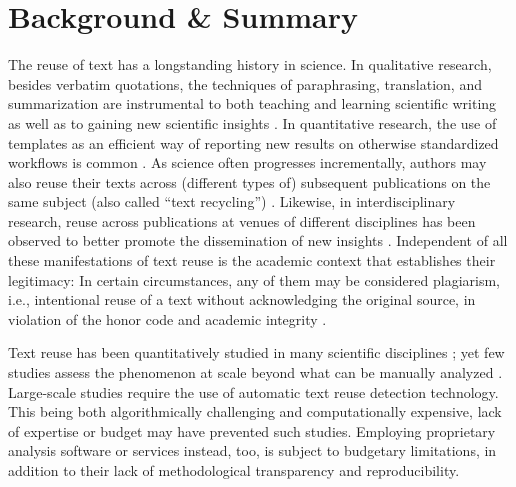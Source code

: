\section*{Background \& Summary}



The reuse of text has a longstanding history in science. In qualitative research, besides verbatim quotations, the techniques of paraphrasing, translation, and summarization are instrumental to both teaching and learning scientific writing as well as to gaining new scientific insights \cite{sun:2015}. In quantitative research, the use of templates as an efficient way of reporting new results on otherwise standardized workflows is common \cite{anson:2020}. As science often progresses incrementally, authors may also reuse their texts across (different types of) subsequent publications on the same subject (also called ``text recycling'') \cite{moskovitz:2015,hall:2018,anson:2020}. Likewise, in interdisciplinary research, reuse across publications at venues of different disciplines has been observed to better promote the dissemination of new insights \cite{bird:2002,wen:2007}. Independent of all these manifestations of text reuse is the academic context that establishes their legitimacy: In certain circumstances, any of them may be considered plagiarism, i.e., intentional reuse of a text without acknowledging the original source, in violation of the honor code and academic integrity \cite{eberle:2013}.

Text reuse has been quantitatively studied in many scientific disciplines \cite{ganascia:2014,citron:2015,sun:2015,horbach:2019,anson:2020};
yet few studies assess the phenomenon at scale beyond what can be manually analyzed \cite{citron:2015,horbach:2019}. Large-scale studies require the use of automatic text reuse detection technology. This being both algorithmically challenging and computationally expensive, lack of expertise or budget may have prevented such studies. Employing proprietary analysis software or services instead, too, is subject to budgetary limitations, in addition to their lack of methodological transparency and reproducibility.

